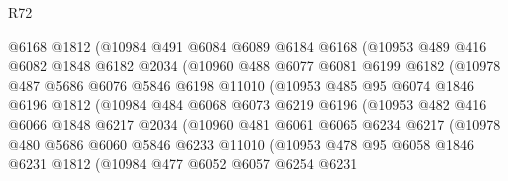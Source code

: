 \begin{lexlean}{R72}
\begin{coremodule}
                  @6168
                  @1812
                  (@10984
                    @491
                    @6084
                    @6089
                    @6184
                    @6168
                    (@10953
                      @489
                      @416
                      @6082
                      @1848
                      @6182
                      @2034
                      (@10960
                        @488
                        @6077
                        @6081
                        @6199
                        @6182
                        (@10978
                          @487
                          @5686
                          @6076
                          @5846
                          @6198
                          @11010
                          (@10953
                            @485
                            @95
                            @6074
                            @1846
                            @6196
                            @1812
                            (@10984
                              @484
                              @6068
                              @6073
                              @6219
                              @6196
                              (@10953
                                @482
                                @416
                                @6066
                                @1848
                                @6217
                                @2034
                                (@10960
                                  @481
                                  @6061
                                  @6065
                                  @6234
                                  @6217
                                  (@10978
                                    @480
                                    @5686
                                    @6060
                                    @5846
                                    @6233
                                    @11010
                                    (@10953
                                      @478
                                      @95
                                      @6058
                                      @1846
                                      @6231
                                      @1812
                                      (@10984
                                        @477
                                        @6052
                                        @6057
                                        @6254
                                        @6231

\end{coremodule}
\end{lexlean}
